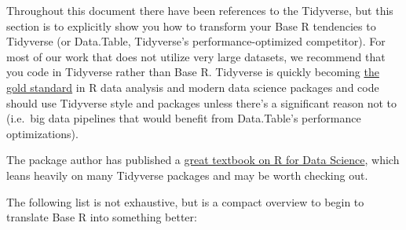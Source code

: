 \documentclass[]{book}
\begin{document}
Throughout this document there have been references to the Tidyverse, but this section is to explicitly show you how to transform your Base R tendencies to Tidyverse (or Data.Table, Tidyverse's performance-optimized competitor). For most of our work that does not utilize very large datasets, we recommend that you code in Tidyverse rather than Base R. Tidyverse is quickly becoming \href{https://rviews.rstudio.com/2017/06/08/what-is-the-tidyverse/}{the gold standard} in R data analysis and modern data science packages and code should use Tidyverse style and packages unless there's a significant reason not to (i.e.~big data pipelines that would benefit from Data.Table's performance optimizations).

The package author has published a \href{https://r4ds.had.co.nz/}{great textbook on R for Data Science}, which leans heavily on many Tidyverse packages and may be worth checking out.

The following list is not exhaustive, but is a compact overview to begin to translate Base R into something better:
\end{document}
